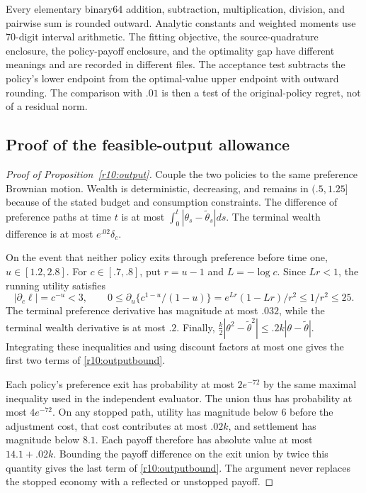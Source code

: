 Every elementary binary64 addition, subtraction, multiplication, division, and pairwise sum is rounded outward. Analytic constants and weighted moments use 70-digit interval arithmetic. The fitting objective, the source-quadrature enclosure, the policy-payoff enclosure, and the optimality gap have different meanings and are recorded in different files. The acceptance test subtracts the policy's lower endpoint from the optimal-value upper endpoint with outward rounding. The comparison with $.01$ is then a test of the original-policy regret, not of a residual norm.

\subsection{Proof of the feasible-output allowance}
\begin{proof}[Proof of Proposition~\ref{r10:output}]
Couple the two policies to the same preference Brownian motion. Wealth is deterministic, decreasing, and remains in $(.5,1.25]$ because of the stated budget and consumption constraints. The difference of preference paths at time $t$ is at most $\int_0^t|\theta_s-\widetilde\theta_s|ds$. The terminal wealth difference is at most $e^{.02}\delta_c$.

On the event that neither policy exits through preference before time one, $u\in[1.2,2.8]$. For $c\in[.7,.8]$, put $r=u-1$ and $L=-\log c$. Since $Lr<1$, the running utility satisfies
\[
 |\partial_c\ell|=c^{-u}<3,\qquad
 0\leq\partial_u\{c^{1-u}/(1-u)\}
 =e^{Lr}(1-Lr)/r^2\leq1/r^2\leq25.
\]
The terminal preference derivative has magnitude at most $.032$, while the terminal wealth derivative is at most $.2$. Finally,
$\frac{k}{2}|\theta^2-\widetilde\theta^2|\leq.2k|\theta-\widetilde\theta|$.
Integrating these inequalities and using discount factors at most one gives the first two terms of \eqref{r10:outputbound}.

Each policy's preference exit has probability at most $2e^{-72}$ by the same maximal inequality used in the independent evaluator. The union thus has probability at most $4e^{-72}$. On any stopped path, utility has magnitude below 6 before the adjustment cost, that cost contributes at most $.02k$, and settlement has magnitude below $8.1$. Each payoff therefore has absolute value at most $14.1+.02k$. Bounding the payoff difference on the exit union by twice this quantity gives the last term of \eqref{r10:outputbound}. The argument never replaces the stopped economy with a reflected or unstopped payoff.
\end{proof}

